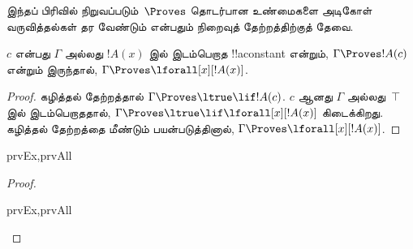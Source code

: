 \documentclass[../../../include/open-logic-section]{subfiles}
\begin{document}


\begin{explain}
  இந்தப் பிரிவில் நிறுவப்படும்~$\Proves$ தொடர்பான உண்மைகளை அடிகோள்
  வருவித்தல்கள் தர வேண்டும் என்பதும் நிறைவுத் தேற்றத்திற்குத் தேவை.
\end{explain}

\begin{thm}
 $c$ என்பது $\Gamma$ அல்லது $!A(x)$ இல்
இடம்பெறாத !!a{constant} என்றும், $\Gamma \Proves !A(c)$ என்றும் இருந்தால்,
$\Gamma \Proves \lforall[x][!A(x)]$.
\end{thm}

\begin{proof}
கழித்தல் தேற்றத்தால் $\Gamma \Proves \ltrue \lif !A(c)$. $c$ ஆனது
$\Gamma$ அல்லது~$\top$ இல் இடம்பெறாததால், $\Gamma \Proves \ltrue \lif
\lforall[x][!A(x)]$ கிடைக்கிறது. கழித்தல் தேற்றத்தை மீண்டும் பயன்படுத்தினால்,
$\Gamma \Proves \lforall[x][!A(x)]$.
\end{proof}

\begin{prop}
\begin{tagenumerate}{prvEx,prvAll}

\end{tagenumerate}
\end{prop}

\begin{proof}
\begin{tagenumerate}{prvEx,prvAll}
\end{tagenumerate}
\end{proof}
\end{document}
